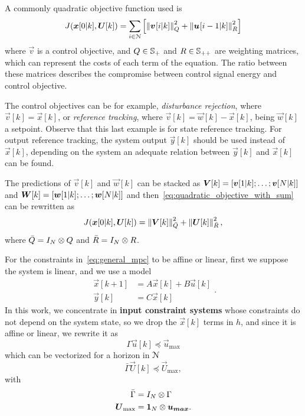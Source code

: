 \documentclass[../main.tex]{subfiles}
\begin{document}
A commonly quadratic objective function used is
\begin{equation}
  \label{eq:quadratic_objective_with_sum}
  J(\vec{x}[0|k],\vec{U}[k])=\sum_{i\in\predictionSet}\left[\norm{\mpcvec{v}[ ][i][k]}^{2}_{Q} +\norm{\mpcvec{u}[ ][i-1][k]}^{2}_{R}\right]
\end{equation}
where $\vec{v}$ is a control objective, and ${ Q\in\mathbb{S}_{+} }$ and ${ R\in\mathbb{S}_{++} }$ are weighting matrices, which can represent the costs of each term of the equation.
The ratio between these matrices describes the compromise between control signal energy and control objective.

The control objectives can be for example, \emph{disturbance rejection}, where ${ \vec{v}[k]=\vec{x}[k] }$, or \emph{reference tracking}, where ${ \vec{v}[k]=\vec{w}[k]-\vec{x}[k] }$, being $\vec{w}[k]$ a setpoint.
Observe that this last example is for state reference tracking.
For output reference tracking, the system output $\vec{y}[k]$ should be used instead of $\vec{x}[k]$, depending on the system an adequate relation between $\vec{y}[k]$ and $\vec{x}[k]$ can be found.

The predictions of $\vec{v}[k]$ and $\vec{w}[k]$ can be stacked as ${ \boldsymbol{V}[k]=[\boldsymbol{v}[1|k];\dots;\boldsymbol{v}[N|k]] }$ and
${ \boldsymbol{W}[k]=[\boldsymbol{w}[1|k];\dots;\boldsymbol{w}[N|k]] }$ and then~\eqref{eq:quadratic_objective_with_sum} can be rewritten as
\begin{equation}
  \label{eq:quadratic_objective_compact}
  J(\boldsymbol{x}[0|k],\boldsymbol{U}[k])=\left\lVert\boldsymbol{V}[k]\right\rVert^{2}_{\bar{Q}} + \left\lVert\boldsymbol{U}[k] \right\rVert^{2}_{\bar{R}},
\end{equation}
where $\bar{Q}=I_{N}\otimes Q$ and
$\bar{R}=I_{N}\otimes R$.

For the constraints in~\eqref{eq:general_mpc} to be affine or linear, first we suppose the system is linear, and we use a \lti{} model
\begin{equation}\label{eq:large_scale_system_model}
  \begin{array}{rl}
    \vec{x}[k+1]&=A\vec{x}[k]+B\vec{u}[k]\\
    \vec{y}[k]&=C\vec{x}[k]
  \end{array}
.
\end{equation}
In this work, we concentrate in \textbf{input constraint systems} whose constraints do not depend on the system state, so we drop the $\vec{x}[k]$ terms in $h$, and since it is affine or linear, we rewrite it as
\begin{equation}
  \Gamma\vec{u}[k]\preceq\vec{u}_{\max}
\end{equation}
which can be vectorized for a horizon in $\mathcal{N}$
\begin{equation}
\bar{\Gamma}\vec{U}[k]\preceq {\vec{U}}_{\text{max}},
\end{equation}
with
\begin{align}
  \label{eq:construction_Gamma}
 \bar{\Gamma}&=I_{N}\otimes\Gamma\\
  \label{eq:construction_Umax}
   \boldsymbol{U}_{\max}&=\mathbf{1}_{N}\otimes\boldsymbol{u_{max}}.
\end{align}
\end{document}

